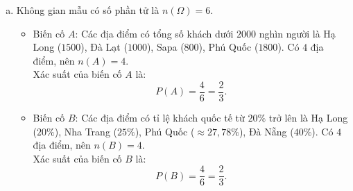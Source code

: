 \begin{bt}
{\begin{enumerate}[a)]
\begin{itemize}
	\end{itemize}
	Vậy địa điểm có tỉ lệ khách quốc tế cao nhất là Đà Nẵng ($40\%$), thấp nhất là Đà Lạt và Sapa ($10\%$).
	\item Không gian mẫu có số phần tử là $n(\Omega) = 6$.
	\begin{itemize}
		\item Biến cố $A$: Các địa điểm có tổng số khách dưới $2000$ nghìn người là Hạ Long ($1500$), Đà Lạt ($1000$), Sapa ($800$), Phú Quốc ($1800$). Có $4$ địa điểm, nên $n(A) = 4$.\\
		Xác suất của biến cố $A$ là:
		$$P(A) = \dfrac{4}{6} = \dfrac{2}{3}.$$
		\item Biến cố $B$: Các địa điểm có tỉ lệ khách quốc tế từ $20\%$ trở lên là Hạ Long ($20\%$), Nha Trang ($25\%$), Phú Quốc ($\approx 27{,}78\%$), Đà Nẵng ($40\%$). Có $4$ địa điểm, nên $n(B) = 4$.\\
		Xác suất của biến cố $B$ là:
		$$P(B) = \dfrac{4}{6} = \dfrac{2}{3}.$$
	\end{itemize}
\end{enumerate}
}
\end{bt}

